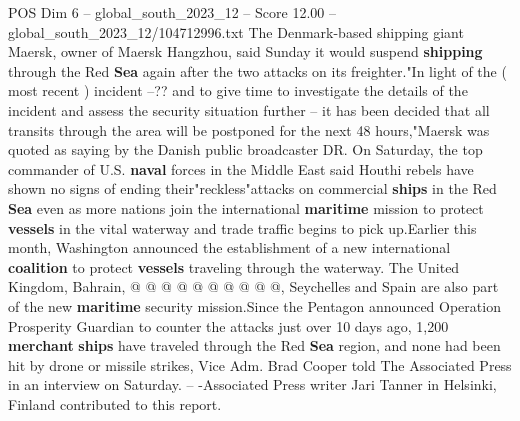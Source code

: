 \begin{textsample}{POS Dim 6 – global\_south\_2023\_12 – Score 12.00 – global\_south\_2023\_12/104712996.txt}
The Denmark-based shipping giant Maersk, owner of Maersk Hangzhou, said Sunday it would suspend \textbf{shipping} through the Red \textbf{Sea} again after the two attacks on its freighter."In light of the ( most recent ) incident --?? and to give time to investigate the details of the incident and assess the security situation further -- it has been decided that all transits through the area will be postponed for the next 48 hours,"Maersk was quoted as saying by the Danish public broadcaster DR.
On Saturday, the top commander of U.S. \textbf{naval} forces in the Middle East said Houthi rebels have shown no signs of ending their"reckless"attacks on commercial \textbf{ships} in the Red \textbf{Sea} even as more nations join the international \textbf{maritime} mission to protect \textbf{vessels} in the vital waterway and trade traffic begins to pick up.Earlier this month, Washington announced the establishment of a new international \textbf{coalition} to protect \textbf{vessels} traveling through the waterway.
The United Kingdom, Bahrain, @ @ @ @ @ @ @ @ @ @, Seychelles and Spain are also part of the new \textbf{maritime} security mission.Since the Pentagon announced Operation Prosperity Guardian to counter the attacks just over 10 days ago, 1,200 \textbf{merchant} \textbf{ships} have traveled through the Red \textbf{Sea} region, and none had been hit by drone or missile strikes, Vice Adm.
Brad Cooper told The Associated Press in an interview on Saturday. -- -Associated Press writer Jari Tanner in Helsinki, Finland contributed to this report.

\end{textsample}
